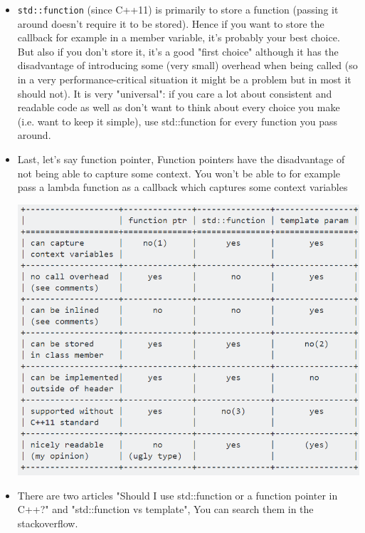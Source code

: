\documentclass[a4paper,11pt,twoside]{book}
\begin{document}
\begin{itemize}
	\item \texttt{std::function} (since C++11) is primarily to store a function (passing it around doesn't require it to be stored). Hence if you want to store the callback for example in a member variable, it's probably your best choice. But also if you don't store it, it's a good "first choice" although it has the disadvantage of introducing some (very small) overhead when being called (so in a very performance-critical situation it might be a problem but in most it should not). It is very "universal": if you care a lot about consistent and readable code as well as don't want to think about every choice you make (i.e. want to keep it simple), use std::function for every function you pass around.
	
	\item Last, let's say function pointer, Function pointers have the disadvantage of not being able to capture some context. You won't be able to for example pass a lambda function as a callback which captures some context variables
	
	\begin{center}
		\includegraphics[scale=0.9]{pics/function.png} 
	\end{center}
	
	\item There are two articles "Should I use std::function or a function pointer in C++?" and "std::function vs template", You can search them in the stackoverflow.
	
\end{itemize}
\end{document}
